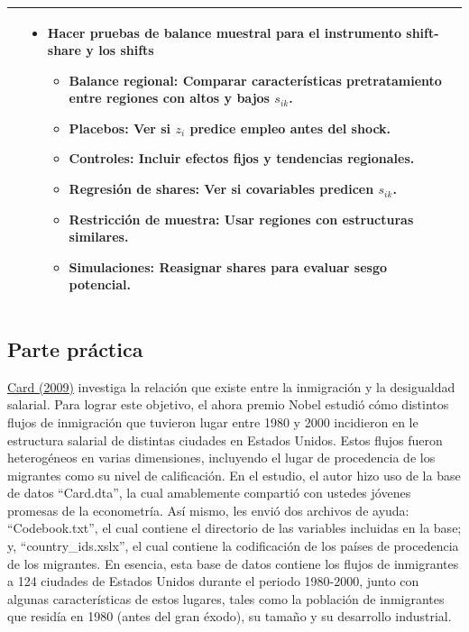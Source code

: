 \documentclass[a4paper, answers, addpoints, 11pt]{exam}
\begin{document}
\begin{enumerate}
\begin{table}[H]
\begin{tabular}{p{5cm} p{6cm} p{6cm}}
&  
\begin{itemize}
\item Hacer pruebas de balance muestral 
    para el instrumento shift-share y los shifts
    \begin{itemize}
    \item \textbf{Balance regional:} Comparar características pretratamiento entre regiones con altos y bajos \( s_{ik} \).
    \item \textbf{Placebos:} Ver si \( z_i \) predice empleo antes del shock.
    \item \textbf{Controles:} Incluir efectos fijos y tendencias regionales.
    \item \textbf{Regresión de shares:} Ver si covariables predicen \( s_{ik} \).
    \item \textbf{Restricción de muestra:} Usar regiones con estructuras similares.
    \item \textbf{Simulaciones:} Reasignar shares para evaluar sesgo potencial.
\end{itemize}
\end{itemize}
 \\
\hline
\end{tabular}
\end{table}


\end{enumerate}

\subsection*{Parte práctica}
\href{https://davidcard.berkeley.edu/papers/immigration-and-inequality.pdf}{Card (2009)} investiga la relación que existe entre la inmigración y la desigualdad salarial. Para lograr este objetivo, el ahora premio Nobel estudió cómo distintos flujos de inmigración que tuvieron lugar entre 1980 y 2000 incidieron en le estructura salarial de distintas ciudades en Estados Unidos. Estos flujos fueron heterogéneos en varias dimensiones, incluyendo el lugar de procedencia de los migrantes como su nivel de calificación. En el estudio, el autor hizo uso de la base de datos ``Card.dta'', la cual amablemente compartió con ustedes jóvenes promesas de la econometría. Así mismo, les envió dos archivos de ayuda: ``Codebook.txt'', el cual contiene el directorio de las variables incluidas en la base; y, ``country\_ids.xslx'', el cual contiene la codificación de los países de procedencia de los migrantes. En esencia, esta base de datos contiene los flujos de inmigrantes a 124 ciudades de Estados Unidos durante el periodo 1980-2000, junto con algunas características de estos lugares, tales como la población de inmigrantes que residía en 1980 (antes del gran éxodo), su tamaño y su desarrollo industrial. \\
\end{document}
